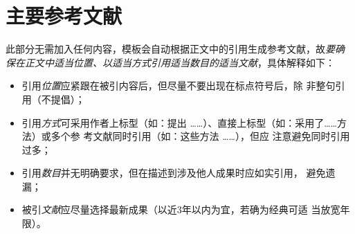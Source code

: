 \section{主要参考文献}

\begin{tcolorbox}
	此部分无需加入任何内容，模板会自动根据正文中的引用生成参考文献，故\emph{要确
		保在正文中适当位置、以适当方式引用适当数目的适当文献}，具体解释如下：
	\begin{itemize}
		\item 引用\emph{位置}应紧跟在被引内容后，但尽量不要出现在标点符号后，除
		      非整句引用（不提倡）；
		\item 引用\emph{方式}可采用作者上标型（如：\citet{chen1980zhongguo}提出
		      ……）、直接上标型（如：采用了……方法\citep{chen2005zhulu}）或多个参
		      考文献同时引用（如：这些方法
		      \citep{Bohan1928,chu2004tushu,Dubrovin1906,hls2012jinji}……），但应
		      注意避免同时引用过多；
		\item 引用\emph{数目}并无明确要求，但在描述到涉及他人成果时应如实引用，
		      避免遗漏；
		\item 被引\emph{文献}应尽量选择最新成果（以近3年以内为宜，若确为经典可适
		      当放宽年限）。
	\end{itemize}
\end{tcolorbox}